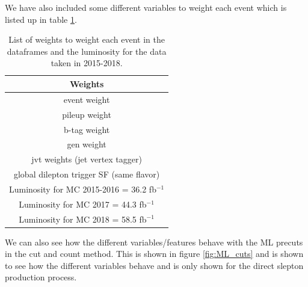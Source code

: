 We have also included some different variables to weight each event which is listed up in table \ref{tab:eventWeights}.

\begin{table}[H]
    \centering
    \renewcommand{\arraystretch}{1.}
    \begin{tabular}{c}
    \toprule
    \textbf{Weights}\\
    \midrule
    \midrule
        event weight  \\
        pileup weight \\
        b-tag weight \\
        gen weight \\
        jvt weights (jet vertex tagger)\\
        global dilepton trigger SF (same flavor)\\
        Luminosity for MC 2015-2016 = 36.2 fb$^{-1}$\\
        Luminosity for MC 2017 = 44.3 fb$^{-1}$\\
        Luminosity for MC 2018 = 58.5 fb$^{-1}$\\
        \bottomrule
    \end{tabular}
    \caption{List of weights to weight each event in the dataframes and the luminosity for the data taken in 2015-2018.}
    \label{tab:eventWeights}
\end{table}

We can also see how the different variables/features behave with the ML precuts in the cut and count method. This is shown in figure \ref{fig:ML_cuts} and is shown to see how the different variables behave and is only shown for the direct slepton production process. 

